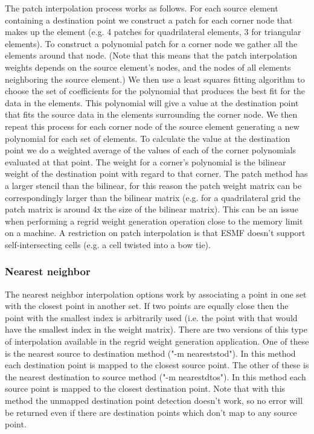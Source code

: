 The patch interpolation process works as follows.
For each source element containing a destination point
we construct a patch for each corner node that makes up the element (e.g. 4 patches for
quadrilateral elements, 3 for triangular elements). To construct a polynomial patch for
a corner node we gather all the elements around that node.
(Note that this means that the patch interpolation weights depends on the source
element's nodes, and the nodes of all elements neighboring the source element.)
We then use a least squares fitting algorithm to choose the set of coefficients
for the polynomial that produces the best fit for the data in the elements.
This polynomial will give a value at the destination point that fits the source data
in the elements surrounding the corner node. We then repeat this process for each
corner node of the source element generating a new polynomial for each set of elements.
To calculate the value at the destination point we do a weighted average of the values
of each of the corner polynomials evaluated at that point. The weight for a corner's
polynomial is the bilinear weight of the destination point with regard to that corner.
The patch method has a larger stencil than the bilinear, for this reason the patch weight matrix can be correspondingly larger
than the bilinear matrix (e.g. for a quadrilateral grid the patch matrix is around 4x the size of
 the bilinear matrix). This can be an issue when performing a regrid weight generation operation close to the memory
limit on a machine. A restriction on patch interpolation is that ESMF doesn't support self-intersecting cells (e.g. a cell twisted into a 
bow tie). 

\subsubsection{Nearest neighbor}\label{sec:rwg_nearest}
The nearest neighbor interpolation options work by associating a point in one set with the closest point in another set. If two points are equally
close then the point with the smallest index is arbitrarily used (i.e. the point with that would have the smallest index in the weight matrix). There are two
versions of this type of interpolation available in the regrid weight generation application. One of these is the nearest source to destination
method ("-m neareststod"). In this method each destination point is mapped to the closest source point. The other of these is the
nearest destination to source method ("-m nearestdtos"). In this method each source point is mapped to the closest destination point. Note
that with this method the unmapped destination point detection doesn't work, so no error will be returned even if there are destination points
which don't map to any source point.

